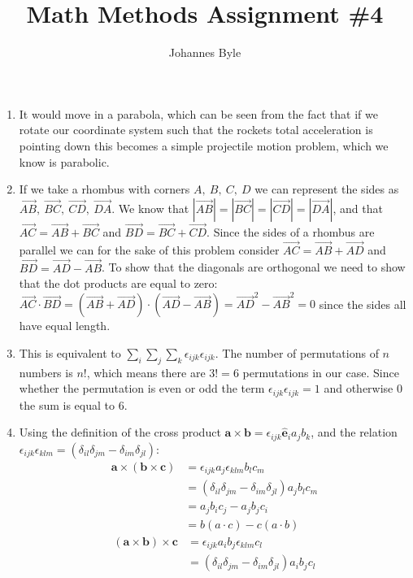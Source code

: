 \documentclass[12pt]{article}
\title{Math Methods Assignment \#4}
\author{Johannes Byle}
\begin{document}
    \maketitle
    \begin{enumerate}
        \item It would move in a parabola, which can be seen from the fact that if we rotate our coordinate system such that the rockets total acceleration is pointing down this becomes a simple projectile motion problem, which we know is parabolic.
        \item If we take a rhombus with corners $A,\ B,\ C,\ D$ we can represent the sides as $\vec{AB},\ \vec{BC},\ \vec{CD},\ \vec{DA}$.
        We know that $|\vec{AB}|=|\vec{BC}|=|\vec{CD}|=|\vec{DA}|$, and that $\vec{AC}=\vec{AB}+\vec{BC}$ and $\vec{BD}=\vec{BC}+\vec{CD}$.
        Since the sides of a rhombus are parallel we can for the sake of this problem consider $\vec{AC}=\vec{AB}+\vec{AD}$ and $\vec{BD}=\vec{AD}-\vec{AB}$.
        To show that the diagonals are orthogonal we need to show that the dot products are equal to zero: $\vec{AC}\cdot\vec{BD}=\left(\vec{AB}+\vec{AD}\right)\cdot\left(\vec{AD}-\vec{AB}\right)=\vec{AD}^2-\vec{AB}^2=0$ since the sides all have equal length.
        \item This is equivalent to $\sum_i\sum_j\sum_k \epsilon_{ijk}\epsilon_{ijk}$.
        The number of permutations of $n$ numbers is $n!$, which means there are $3!=6$ permutations in our case.
        Since whether the permutation is even or odd the term $\epsilon_{ijk}\epsilon_{ijk}=1$ and otherwise 0 the sum is equal to 6.
        \item Using the definition of the cross product $\pmb{a}\times\pmb{b}=\epsilon_{ijk}\pmb{\hat{e}}_i a_j b_k$, and the relation $\epsilon_{ijk}\epsilon_{klm}=(\delta_{il}\delta_{jm}-\delta_{im}\delta_{jl})$:
        \begin{align}
            \pmb{a}\times(\pmb{b}\times\pmb{c})& =\epsilon_{ijk}a_j\epsilon_{klm}b_l c_m\\
            & =(\delta_{il}\delta_{jm}-\delta_{im}\delta_{jl})a_j b_l c_m\\
            & =a_j b_i c_j-a_j b_j c_i\\
            & =b(a\cdot c)-c(a\cdot b)
        \end{align}
        \begin{align}
        (\pmb{a}\times\pmb{b})
            \times\pmb{c}& =\epsilon_{ijk}a_i b_j\epsilon_{klm}c_l\\
            & =(\delta_{il}\delta_{jm}-\delta_{im}\delta_{jl})a_i b_j c_l\\

\end{align}
\end{enumerate}
\end{document}
